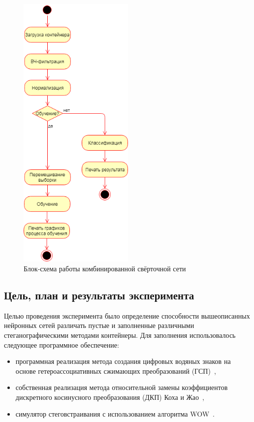 \begin{figure}[ph]
\centering
\includegraphics[width=0.5\textwidth]{include/graphics/flowchart}
\caption{Блок-схема работы комбинированной свёрточной сети}
\label{fig:flowchart}
\end{figure}

\subsection{Цель, план и результаты эксперимента}

Целью проведения эксперимента было определение способности вышеописанных нейронных сетей различать пустые и заполненные различными стеганографическими методами контейнеры. Для заполнения использовалось следующее программное обеспечение:
\begin{itemize}
\item программная реализация метода создания цифровых водяных знаков на основе гетероассоциативных сжимающих преобразований (ГСП)~\cite{SirotaHIC},
\item собственная реализация метода относительной замены коэффициентов дискретного косинусного преобразования (ДКП) Коха и Жао~\cite{ZhaoKoch, KochZhao},
\item симулятор стеговстраивания с использованием алгоритма WOW~\cite{WOW}.
\end{itemize}

